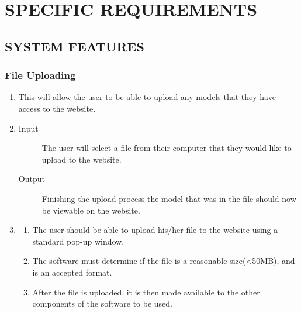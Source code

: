 \documentclass[letterpaper, 10pt, draftclsnofoot, compsoc, onecolumn]{IEEEtran}
\begin{document}
\section{SPECIFIC REQUIREMENTS}
\bigskip

\subsection{SYSTEM FEATURES}
\medskip

\subsubsection{File Uploading}

\begin{enumerate}
	\item This will allow the user to be able to upload any models that they have access to the website.

	\item
	\begin{description} 
		\item[Input] The user will select a file from their computer that they would like to upload to the website. 
		\item[Output] Finishing the upload process the model that was in the file should now be viewable on the website. 
	\end{description}
	


	\item
	\begin{enumerate}
		\item The user should be able to upload his/her file to the website using a standard pop-up window.
		\item The software must determine if the file is a reasonable size(<50MB), and is an accepted format. 
		\item After the file is uploaded, it is then made available to the other components of the software to be used.
	\end{enumerate}
\end{enumerate}
\end{document}

